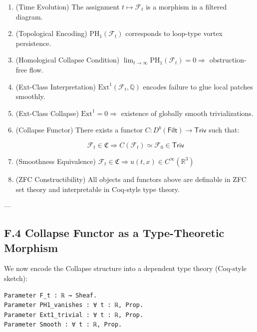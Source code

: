 \documentclass[11pt]{article}
\begin{document}
{\begin{enumerate}
  \item[\textbf{A₂.}] (Time Evolution)  
  The assignment \( t \mapsto \mathcal{F}_t \) is a morphism in a filtered diagram.

  \item[\textbf{A₃.}] (Topological Encoding)  
  \( \mathrm{PH}_1(\mathcal{F}_t) \) corresponds to loop-type vortex persistence.

  \item[\textbf{A₄.}] (Homological Collapse Condition)  
  \( \lim_{t \to \infty} \mathrm{PH}_1(\mathcal{F}_t) = 0 \Rightarrow \) obstruction-free flow.

  \item[\textbf{A₅.}] (Ext-Class Interpretation)  
  \( \mathrm{Ext}^1(\mathcal{F}_t, \mathbb{Q}) \) encodes failure to glue local patches smoothly.

  \item[\textbf{A₆.}] (Ext-Class Collapse)  
  \( \mathrm{Ext}^1 = 0 \Rightarrow \) existence of globally smooth trivializations.

  \item[\textbf{A₇.}] (Collapse Functor)  
  There exists a functor \( C: D^b(\mathsf{Filt}) \to \mathsf{Triv} \) such that:

  \[
  \mathcal{F}_t \in \mathfrak{C} \Rightarrow C(\mathcal{F}_t) \simeq \mathcal{F}_0 \in \mathsf{Triv}
  \]

  \item[\textbf{A₈.}] (Smoothness Equivalence)  
  \( \mathcal{F}_t \in \mathfrak{C} \Rightarrow u(t,x) \in C^\infty(\mathbb{R}^3) \)

  \item[\textbf{A₉.}] (ZFC Constructibility)  
  All objects and functors above are definable in ZFC set theory and interpretable in Coq-style type theory.
\end{enumerate}

---

\subsection*{F.4 Collapse Functor as a Type-Theoretic Morphism}

We now encode the Collapse structure into a dependent type theory (Coq-style sketch):

\begin{lstlisting}[language=Coq, caption=Collapse Type Structure in Coq]
Parameter F_t : ℝ → Sheaf.
Parameter PH1_vanishes : ∀ t : ℝ, Prop.
Parameter Ext1_trivial : ∀ t : ℝ, Prop.
Parameter Smooth : ∀ t : ℝ, Prop.


\end{lstlisting}}
\end{document}

